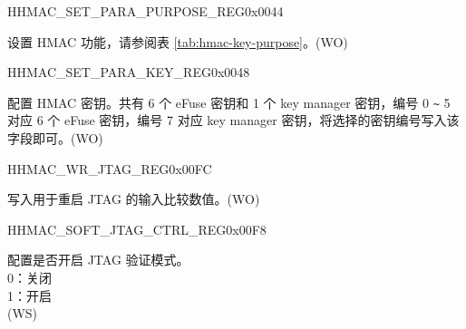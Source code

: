     \begin{register}{H}{HMAC\_SET\_PARA\_PURPOSE\_REG}{0x0044}\label{regdesc:HMACSETPARAPURPOSEREG}
    \regnewline%
    \begin{regdesc}\begin{reglist}
    \label{fielddesc:HMACPURPOSESET}\item [HMAC\_PURPOSE\_SET] 设置 HMAC 功能，请参阅表 \ref{tab:hmac-key-purpose}。(WO)
    \end{reglist}\end{regdesc}
    \end{register}


    \begin{register}{H}{HMAC\_SET\_PARA\_KEY\_REG}{0x0048}\label{regdesc:HMACSETPARAKEYREG}
    \regnewline%
    \begin{regdesc}\begin{reglist}
    \label{fielddesc:HMACKEYSET}\item [HMAC\_KEY\_SET] 配置 HMAC 密钥。共有 6 个 eFuse 密钥和 1 个 key manager 密钥，编号 0 \verb+~+ 5 对应 6 个 eFuse 密钥，编号 7 对应 key manager 密钥，将选择的密钥编号写入该字段即可。(WO)
    \end{reglist}\end{regdesc}
    \end{register}


    \begin{register}{H}{HMAC\_WR\_JTAG\_REG}{0x00FC}\label{regdesc:HMACWRJTAGREG}
    \regnewline%
    \begin{regdesc}\begin{reglist}
    \label{fielddesc:HMACWRJTAG}\item [HMAC\_WR\_JTAG] 写入用于重启 JTAG 的输入比较数值。(WO)
    \end{reglist}\end{regdesc}
    \end{register}


    \begin{register}{H}{HMAC\_SOFT\_JTAG\_CTRL\_REG}{0x00F8}\label{regdesc:HMACSOFTJTAGCTRLREG}
    \regnewline%
    \begin{regdesc}\begin{reglist}
    \label{fielddesc:HMACSOFTJTAGCTRL}\item [HMAC\_SOFT\_JTAG\_CTRL] 配置是否开启 JTAG 验证模式。
    \\0：关闭
    \\1：开启 
    \\ (WS)
    \end{reglist}\end{regdesc}
    \end{register}


